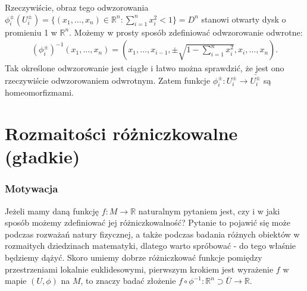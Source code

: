 Rzeczywiście, obraz tego odwzorowania $\phi_i^{\pm}(U_i^{\pm}) = \{(x_1, \dots, x_n) \in \mathbb{R}^n : \sum_{i=1}^{n} x_i^2 < 1\} = D^n$ stanowi otwarty dysk o promieniu 1 w $\mathbb{R}^n$. Możemy w prosty sposób zdefiniować odwzorowanie odwrotne:
\begin{align*}
	\left(\phi_i^{\pm}\right)^{-1}(x_1, \dots, x_n) = \left(x_1, \dots, x_{i-1}, \pm \sqrt{1-\sum_{i=1}^{n} x_i^2}, x_{i}, \dots, x_n\right).
\end{align*}
Tak określone odwzorowanie jest ciągłe i łatwo można sprawdzić, że jest ono rzeczywiście odwzorowaniem odwrotnym. Zatem funkcje $\phi_{i}^{\pm} : U_{i}^{\pm} \to \bar{U_{i}^{\pm}}$ są homeomorfizmami.

\section{Rozmaitości różniczkowalne (gładkie)}
\subsubsection{Motywacja}
Jeżeli mamy daną funkcję $f : M \to \mathbb{R}$ naturalnym pytaniem jest, czy i w jaki sposób możemy zdefiniować jej różniczkowalność? Pytanie to pojawić się może podczas rozważań natury fizycznej, a także podczas badania różnych obiektów w rozmaitych dziedzinach matematyki, dlatego warto spróbować - do tego właśnie będziemy dążyć. Skoro umiemy dobrze różniczkować funkcje pomiędzy przestrzeniami lokalnie euklidesowymi, pierwszym krokiem jest wyrażenie $f$ w mapie $(U,\phi)$ na $M$, to znaczy badać złożenie $f\circ \phi^{-1} : \mathbb{R}^n \supset \bar{U} \to \mathbb{R}$. 
